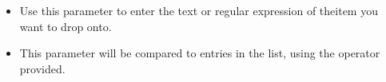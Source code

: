 
\begin{itemize}
\item Use this parameter to enter the text or regular expression  of theitem you want to drop onto.
\item This parameter will be compared to entries in the list, using the operator provided.
\end{itemize}
